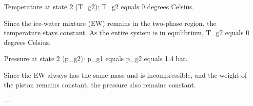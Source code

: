 Temperature at state 2 (T_g2):  
T_g2 equals 0 degrees Celsius.  

Since the ice-water mixture (EW) remains in the two-phase region, the temperature stays constant. As the entire system is in equilibrium, T_g2 equals 0 degrees Celsius.  

Pressure at state 2 (p_g2):  
p_g1 equals p_g2 equals 1.4 bar.  

Since the EW always has the same mass and is incompressible, and the weight of the piston remains constant, the pressure also remains constant.  

---